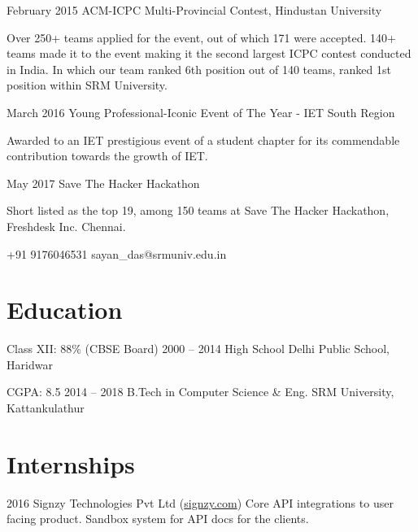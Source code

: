 \documentclass{tccv}
\makeatletter
\newcommand{\at}{\makeatletter @\makeatother}
\makeatother
\begin{document}
\begin{eventlist}

\item{February 2015}
     {}
     {ACM-ICPC Multi-Provincial Contest, Hindustan University}

Over 250+ teams applied for the event, out of which 171 were accepted. 140+ teams made it to the event making it the second largest ICPC contest conducted in India. In which our team ranked 6th position out of 140 teams, ranked 1st position within SRM University.

\item{March 2016}
     {}
     {Young Professional-Iconic Event of The Year - IET South Region}

  Awarded to an IET prestigious event of a student chapter for its commendable contribution towards the growth of IET.

\item{May 2017}
     {}
     {Save The Hacker Hackathon}

Short listed as the top 19, among 150 teams at Save The Hacker Hackathon, Freshdesk Inc. Chennai. 

\end{eventlist}

    {+91 9176046531}
    {sayan\_das\at srmuniv.edu.in}

\section{Education}

\begin{yearlist}

\item[Class XII: 88\% (CBSE Board)]{2000 -- 2014}
     {High School}
     {Delhi Public School, Haridwar}

\item[CGPA: 8.5]{2014 -- 2018}
     {B.Tech in Computer Science \& Eng.}
     {SRM University, Kattankulathur}

\end{yearlist}

\section{Internships}

\begin{yearlist}

\item{2016}
     {Signzy Technologies Pvt Ltd (\href{https://signzy.com}{signzy.com})}
     {Core API integrations to user facing product. Sandbox system for API docs for the clients.}

\end{yearlist}
\end{document}
